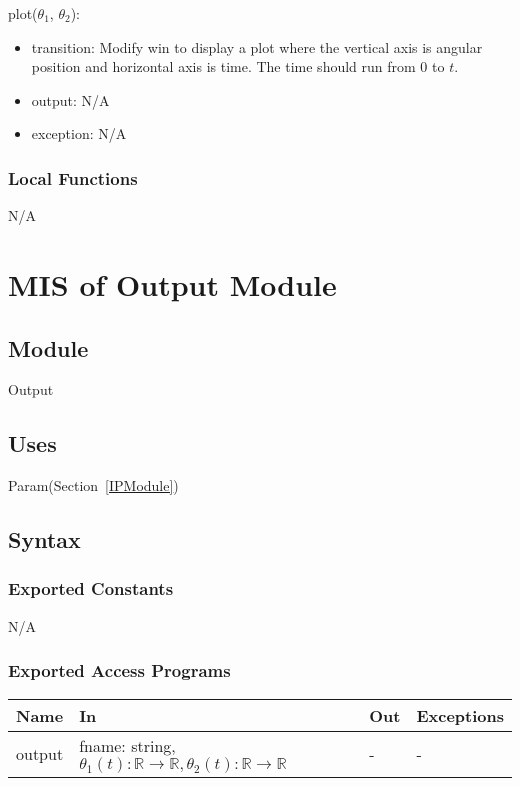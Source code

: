 \documentclass[12pt, titlepage]{article}
\begin{document}
\noindent plot($\theta_1$, $\theta_2$):
\begin{itemize}
\item transition: Modify win to display a plot where the vertical axis
  is angular position and horizontal axis is time. The time should run from $0$ to $t$.
\item output: N/A
\item exception: N/A
\end{itemize}

\subsubsection{Local Functions}

N/A
\newpage


\section{MIS of Output Module} \label{OModule} 

\subsection{Module}

Output

\subsection{Uses}
Param(Section~\ref{IPModule})

\subsection{Syntax}

\subsubsection{Exported Constants}
N/A
\subsubsection{Exported Access Programs}

\begin{center}
\begin{tabular}{p{3cm} p{7cm} p{2cm} p{2cm}}
\hline
\textbf{Name} & \textbf{In} & \textbf{Out} & \textbf{Exceptions} \\
\hline
output & fname: string, $\theta_1(t):\mathbb{R} \rightarrow \mathbb{R},
                 \theta_2(t):\mathbb{R} \rightarrow \mathbb{R}$ & - & - \\
\hline
\end{tabular}
\end{center}
\end{document}
